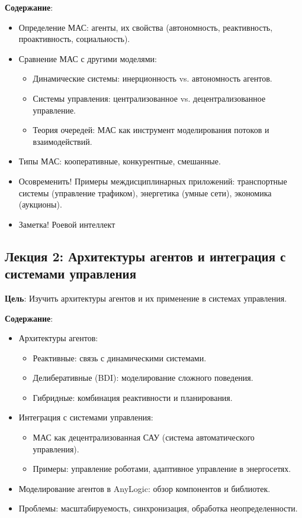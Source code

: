 \textbf{Содержание}:
\begin{itemize}
    \item Определение МАС: агенты, их свойства (автономность, реактивность, проактивность, социальность).
    \item Сравнение МАС с другими моделями:
    \begin{itemize}
        \item Динамические системы: инерционность vs. автономность агентов.
        \item Системы управления: централизованное vs. децентрализованное управление.
        \item Теория очередей: МАС как инструмент моделирования потоков и взаимодействий.
    \end{itemize}
    \item Типы МАС: кооперативные, конкурентные, смешанные.
    \item Осовременить! Примеры междисциплинарных приложений: транспортные системы (управление трафиком), энергетика (умные сети), экономика (аукционы).
    \item Заметка! Роевой интеллект
\end{itemize}

\subsection*{Лекция 2: Архитектуры агентов и интеграция с системами управления}
\textbf{Цель}: Изучить архитектуры агентов и их применение в системах управления.

\textbf{Содержание}:
\begin{itemize}
    \item Архитектуры агентов:
    \begin{itemize}
        \item Реактивные: связь с динамическими системами.
        \item Делиберативные (BDI): моделирование сложного поведения.
        \item Гибридные: комбинация реактивности и планирования.
    \end{itemize}
    \item Интеграция с системами управления:
    \begin{itemize}
        \item МАС как децентрализованная САУ (система автоматического управления).
        \item Примеры: управление роботами, адаптивное управление в энергосетях.
    \end{itemize}
    \item Моделирование агентов в AnyLogic: обзор компонентов и библиотек.
    \item Проблемы: масштабируемость, синхронизация, обработка неопределенности.
\end{itemize}

